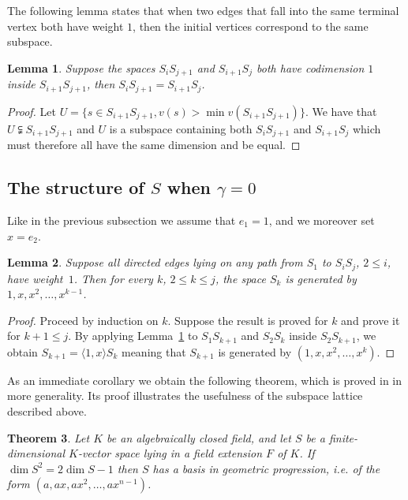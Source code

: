 \documentclass{article}
\theoremstyle{plain}
\newtheorem{thm}{Theorem}[section]
\newtheorem{lemma}[thm]{Lemma}
\theoremstyle{definition}
\theoremstyle{remark}
\renewcommand{\leq}{\leqslant}
\begin{document}
The following lemma states that when two edges that fall into the same
terminal vertex both have weight $1$, then the initial vertices
correspond to the same subspace.

\begin{lemma}\label{lem:codim1}
  Suppose the spaces $S_iS_{j+1}$ and $S_{i+1}S_j$ both have codimension $1$
  inside $S_{i+1}S_{j+1}$, then $S_iS_{j+1} = S_{i+1}S_j$.
\end{lemma}

\begin{proof}
  Let $U=\{s\in S_{i+1}S_{j+1}, v(s)>\min v(S_{i+1}S_{j+1})\}$. We
  have that $U\subsetneqq S_{i+1}S_{j+1}$ and $U$ is a subspace
  containing both $S_iS_{j+1}$ and $S_{i+1}S_j$ which must therefore
  all have the same dimension and be equal.
\end{proof}

\subsection{The structure of $S$ when $\gamma=0$}
\label{sec:Vosper}

Like in the previous subsection we assume that $e_1=1$, and we moreover set $x=e_2$.

\begin{lemma}\label{lem:vosper}
  Suppose all directed edges lying on any path from $S_1$ to $S_iS_j$,
  $2\leq i$, have weight~$1$. Then for every $k$, $2\leq k\leq j$, the space $S_k$ is generated
  by $1,x,x^2,\ldots ,x^{k-1}$.
\end{lemma}

\begin{proof}
Proceed by induction on $k$. Suppose the result is
  proved for $k$ and prove it for $k+1\leq j$. By applying
  Lemma~\ref{lem:codim1} to $S_1S_{k+1}$ and $S_2S_k$ inside
  $S_2S_{k+1}$, we obtain $S_{k+1}=\langle 1,x\rangle S_k$ meaning
  that $S_{k+1}$ is generated by $(1,x,x^2,\ldots ,x^{k})$.
\end{proof}

As an immediate corollary we obtain
the following theorem, which is proved in \cite{bszVosper} in more
generality. Its proof illustrates the usefulness of
the subspace lattice described above.


\begin{thm}\label{thm:genus0}
  Let $K$ be an algebraically closed field, and let $S$ be a
  finite-dimensional $K$-vector space lying in a field extension $F$
  of $K$. If $\dim S^2=2\dim S-1$ then $S$ has a basis in geometric
  progression, i.e. of the form $(a,ax,ax^2,\ldots ,ax^{n-1})$.
\end{thm}
\end{document}
